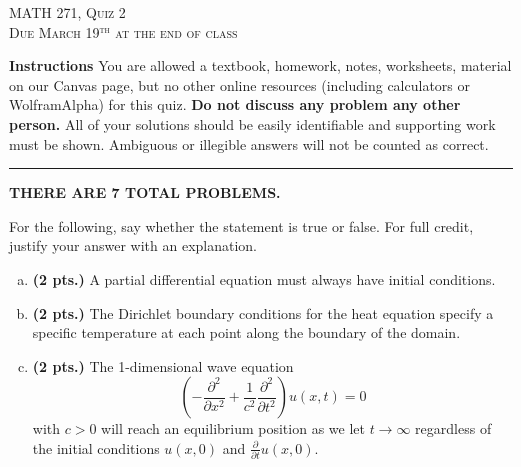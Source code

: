 \documentclass[12pt]{amsbook}
\begin{document}

\begin{center}
   \textsc{\large MATH 271, Quiz 2}\\
   \textsc{Due March 19$^\textrm{th}$ at the end of class}
\end{center}

\vspace{1cm}

\noindent\textbf{Instructions} \; You are allowed a textbook, homework, notes, worksheets, material on our Canvas page, but no other online resources (including calculators or WolframAlpha) for this quiz.  \textbf{Do not discuss any problem any other person.} All of your solutions should be easily identifiable and supporting work must be shown.  Ambiguous or illegible answers will not be counted as correct.


\vspace*{.5cm}
\hrule
\vspace*{.5cm}

\begin{center}\textbf{\large THERE ARE 7 TOTAL PROBLEMS.}\normalsize \end{center}

\begin{problem} For the following, say whether the statement is true or false. For full credit, justify your answer with an explanation.
\begin{enumerate}[(a)]
    \item \textbf{(2 pts.)} A partial differential equation must always have initial conditions.
    \item \textbf{(2 pts.)} The Dirichlet boundary conditions for the heat equation specify a specific temperature at each point along the boundary of the domain.
    \item \textbf{(2 pts.)} The 1-dimensional wave equation
    \[
    \left(-\frac{\partial^2}{\partial x^2}+\frac{1}{c^2} \frac{\partial^2}{\partial t^2}\right) u(x,t) =0
    \]
    with $c>0$ will reach an equilibrium position as we let $t\to \infty$ regardless of the initial conditions $u(x,0)$ and $\frac{\partial}{\partial t} u(x,0)$.
\end{enumerate}
\end{problem}
\vspace*{.5cm}
\end{document}
